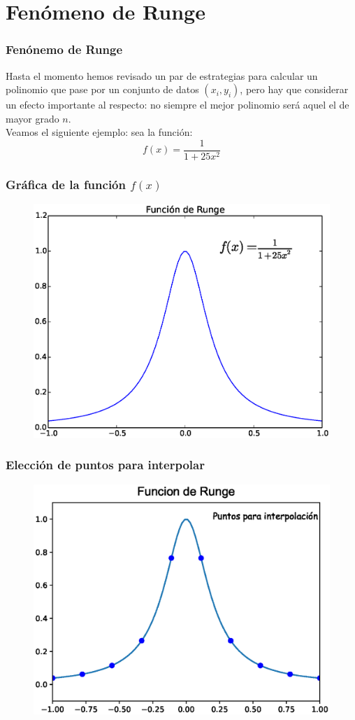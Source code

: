\section{Fenómeno de Runge}
\begin{frame}
\frametitle{Fenónemo de Runge}
Hasta el momento hemos revisado un par de estrategias para calcular un polinomio que pase por un conjunto de datos $(x_{i}, y_{i})$, pero hay que considerar un efecto importante al respecto: no siempre el mejor polinomio será aquel el de mayor grado $n$.
\\
\medskip
Veamos el siguiente ejemplo: sea la función:
\[ f(x) = \dfrac{1}{1 + 25 x^{2}}\]
\end{frame}
\begin{frame}
\frametitle{Gráfica de la función $f(x)$}
\begin{figure}
	\centering
	\includegraphics[scale=0.5]{Imagenes/Funcion_Runge_01.eps} 
\end{figure}
\end{frame}
\begin{frame}
\frametitle{Elección de puntos para interpolar}
\begin{figure}
	\centering
	\includegraphics[scale=0.5]{Imagenes/Funcion_Runge_2017_01.eps} 
\end{figure}
\end{frame}
